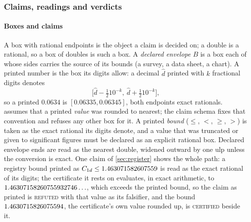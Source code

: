 \documentclass[preprint,11pt,a4paper]{elsarticle}
\theoremstyle{definition}
\newcommand{\verdict}[1]{\textup{\textsc{#1}}}
\newcommand{\CERT}{\verdict{certified}}
\newcommand{\REFT}{\verdict{refuted}}
\begin{document}
\subsubsection{Claims, readings and verdicts}\label{sec:grammar}

\paragraph{Boxes and claims}
A box with rational endpoints is the object a claim is decided on; a double is a rational, so a box of doubles is such a box. A \emph{declared envelope} $B$ is a box each of whose sides carries the source of its bounds (a survey, a data sheet, a chart). A printed number is the box its digits allow: a decimal $\hat d$ printed with $k$ fractional digits denotes
\begin{equation}\label{eq:printed}
\bigl[\hat d-\tfrac12 10^{-k},\ \hat d+\tfrac12 10^{-k}\bigr],
\end{equation}
so a printed $0.0634$ is $[0.06335,0.06345]$, both endpoints exact rationals.  assumes that a printed \emph{value} was rounded to nearest; the claim schema fixes that convention and refuses any other box for it. A printed \emph{bound} ($\le$, $<$, $\ge$, $>$) is taken as the exact rational its digits denote, and a value that was truncated or given to significant figures must be declared as an explicit rational box. Declared envelope ends are read as the nearest double, widened outward by one ulp unless the conversion is exact. One claim of \cref{sec:register} shows the whole path: a registry bound printed as $C_{1d}\le1.463071582607559$ is read as the exact rational of its digits; the certificate it rests on evaluates, in exact arithmetic, to $1.46307158260755932746\ldots$, which exceeds the printed bound, so the claim as printed is \REFT{} with that value as its falsifier, and the bound $1.4630715826075594$, the certificate's own value rounded up, is \CERT{} beside it.
\end{document}

